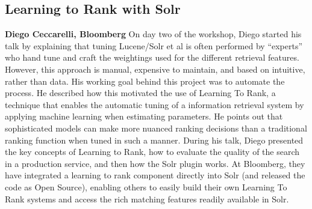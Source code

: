 \subsection*{Learning to Rank with Solr} 
{\bf Diego Ceccarelli, Bloomberg}
On day two of the workshop, Diego started his talk by explaining that tuning Lucene/Solr et al is often performed by ``experts'' who hand tune and craft the weightings used for the different retrieval features. However, this approach is manual, expensive to maintain, and based on intuitive, rather than data. His working goal behind this project was to automate the process. He described how this motivated the use of Learning To Rank, a technique that enables the automatic tuning of a information retrieval system by applying machine learning when estimating parameters. He points out that sophisticated models can make more nuanced ranking decisions than a traditional ranking function when tuned in such a manner. During his talk, Diego presented the key concepts of Learning to Rank, how to evaluate the quality of the search in a production service, and then how the Solr plugin works. At Bloomberg, they have integrated a learning to rank component directly into Solr (and released the code as Open Source), enabling others to easily build their own Learning To Rank systems and access the rich matching features readily available in Solr. 


